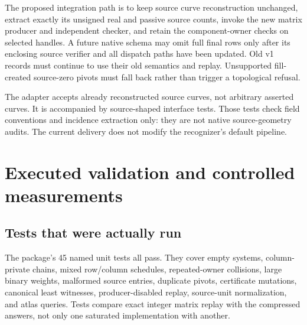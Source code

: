 \documentclass[11pt,letterpaper]{article}
\theoremstyle{definition}
\begin{document}
The proposed integration path is to keep source curve reconstruction unchanged, extract exactly its unsigned real and passive source counts, invoke the new matrix producer and independent checker, and retain the component-owner checks on selected handles. A future native schema may omit full final rows only after its enclosing source verifier and all dispatch paths have been updated. Old v1 records must continue to use their old semantics and replay. Unsupported fill-created source-zero pivots must fall back rather than trigger a topological refusal.

The adapter accepts already reconstructed source curves, not arbitrary asserted curves. It is accompanied by source-shaped interface tests. Those tests check field conventions and incidence extraction only: they are not native source-geometry audits. The current delivery does not modify the recognizer's default pipeline.

\section{Executed validation and controlled measurements}
\subsection{Tests that were actually run}
The package's 45 named unit tests all pass. They cover empty systems, column-private chains, mixed row/column schedules, repeated-owner collisions, large binary weights, malformed source entries, duplicate pivots, certificate mutations, canonical least witnesses, producer-disabled replay, source-unit normalization, and atlas queries. Tests compare exact integer matrix replay with the compressed answers, not only one saturated implementation with another.
\end{document}
